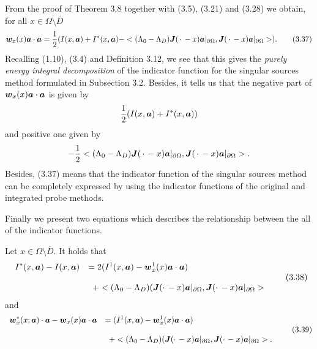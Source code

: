 From the proof of Theorem 3.8 together with (3.5), (3.21) and (3.28) we obtain,
for all $x\in\Omega\setminus\overline{D}$
$$\displaystyle
\mbox{\boldmath $w$}_x(x)\mbox{\boldmath $a$}\cdot\mbox{\boldmath $a$}
=\frac{1}{2}(I(x,\mbox{\boldmath $a$})+I^*(x,\mbox{\boldmath $a$})
-<(\Lambda_0-\Lambda_D)\mbox{\boldmath $J$}(\,\cdot\,-x)\mbox{\boldmath $a$}\vert_{\partial\Omega},
\mbox{\boldmath $J$}(\,\cdot\,-x)\mbox{\boldmath $a$}\vert_{\partial\Omega}>).
\tag {3.37}
$$
Recalling (1.10), (3.4) and Definition 3.12, we see that this gives the {\it purely energy integral decomposition}
of the indicator function for the singular sources method formulated in Subsection 3.2.
Besides, it tells us that
the negative part of $\mbox{\boldmath $w$}_x(x)\mbox{\boldmath $a$}\cdot\mbox{\boldmath $a$}$
is given by
$$\displaystyle
\frac{1}{2}(I(x,\mbox{\boldmath $a$})+I^*(x,\mbox{\boldmath $a$}))
$$
and positive one given by
$$\displaystyle
-\frac{1}{2}
<(\Lambda_0-\Lambda_D)\mbox{\boldmath $J$}(\,\cdot\,-x)\mbox{\boldmath $a$}\vert_{\partial\Omega},
\mbox{\boldmath $J$}(\,\cdot\,-x)\mbox{\boldmath $a$}\vert_{\partial\Omega}>.
$$
Besides, (3.37) means that the indicator function of the singular sources method can be completely
expressed by using the indicator functions of  the original and integrated probe methods.






Finally we present two equations which describes the relationship between the all of the indicator functions.

  Let $x\in\Omega\setminus\overline{D}$.
It holds that
$$\begin{array}{ll}
\displaystyle
I^*(x,\mbox{\boldmath $a$})-I(x,\mbox{\boldmath $a$})
&
\displaystyle
=
2(I^1(x,\mbox{\boldmath $a$})-\mbox{\boldmath $w$}_x^1(x)\mbox{\boldmath $a$}\cdot\mbox{\boldmath $a$})
\\
\\
\displaystyle
&
\displaystyle
\,\,\,
+<(\Lambda_0-\Lambda_D)(\mbox{\boldmath $J$}(\cdot\,-x)\mbox{\boldmath $a$}\vert_{\partial\Omega},\mbox{\boldmath $J$}(\cdot\,-x)\mbox{\boldmath $a$}\vert_{\partial\Omega}>
\end{array}
\tag {3.38}
$$
and
$$\begin{array}{ll}
\displaystyle
\mbox{\boldmath $w$}^*_x(x;\mbox{\boldmath $a$})\cdot\mbox{\boldmath $a$}-\mbox{\boldmath $w$}_x(x)\mbox{\boldmath $a$}\cdot\mbox{\boldmath $a$}
&
\displaystyle
=
(I^1(x,\mbox{\boldmath $a$})-\mbox{\boldmath $w$}_x^1(x)\mbox{\boldmath $a$}\cdot\mbox{\boldmath $a$})
\\
\\
\displaystyle
&
\displaystyle
\,\,\,+
<(\Lambda_0-\Lambda_D)(\mbox{\boldmath $J$}(\cdot\,-x)\mbox{\boldmath $a$}\vert_{\partial\Omega},\mbox{\boldmath $J$}(\cdot\,-x)\mbox{\boldmath $a$}\vert_{\partial\Omega}>.
\end{array}
\tag {3.39}
$$



